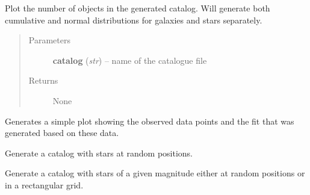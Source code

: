 \documentclass[a4paper,11pt,english]{sphinxmanual}
\begin{document}

\begin{fulllineitems}
\label{sources:sources.createObjectCatalogue.plotCatalog}
Plot the number of objects in the generated catalog. Will generate both cumulative and normal
distributions for galaxies and stars separately.
\begin{quote}\begin{description}
\item[{Parameters}] \leavevmode
\textbf{catalog} (\emph{str}) -- name of the catalogue file

\item[{Returns}] \leavevmode
None

\end{description}\end{quote}

\end{fulllineitems}


\begin{fulllineitems}
\label{sources:sources.createObjectCatalogue.plotDistributionFunction}
Generates a simple plot showing the observed data points and the fit
that was generated based on these data.

\end{fulllineitems}


\begin{fulllineitems}
\label{sources:sources.createObjectCatalogue.starCatalog}
Generate a catalog with stars at random positions.

\end{fulllineitems}


\begin{fulllineitems}
\label{sources:sources.createObjectCatalogue.starCatalogFixedMagnitude}
Generate a catalog with stars of a given magnitude either at random positions or in a rectangular grid.

\end{fulllineitems}
\end{document}
